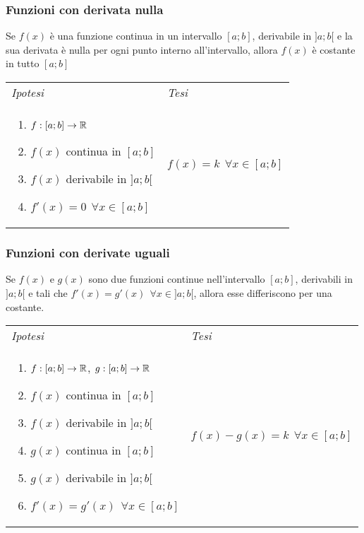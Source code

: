         \subsubsection{Funzioni con derivata nulla}
            \begin{shadedTheorem}
                Se $f(x)$ è una funzione continua in un intervallo $[a;b]$, derivabile in $]a;b[$ e la sua derivata è nulla per ogni punto interno all'intervallo, allora $f(x)$ è costante in tutto $[a;b]$
            \end{shadedTheorem}
            \begin{tabular}{m{}m{}}
                \textit{Ipotesi} & \textit{Tesi}  \\ 
                \begin{enumerate}
                \item $f:[a;b] \to \mathbb{R}$
                \item $f(x)$ continua in $[a;b]$
                \item $f(x)$ derivabile in $]a;b[$
                \item $f'(x)=0~~\forall x \in [a;b]$
        \end{enumerate} & $f(x)=k ~~ \forall x \in [a;b]$
           \end{tabular}
           
        \subsubsection{Funzioni con derivate uguali}
            \begin{shadedTheorem}
                Se $f(x)$ e $g(x)$ sono due funzioni continue nell'intervallo $[a;b]$, derivabili in $]a;b[$ e tali che $f'(x)=g'(x)~~\forall x \in ]a;b[$, allora esse differiscono per una costante.
            \end{shadedTheorem}
            \begin{tabular}{m{}m{}}
            \textit{Ipotesi} & \textit{Tesi}\\
            \begin{enumerate}
                \item $f:[a;b] \to \mathbb{R}$, $g: [a;b] \to \mathbb{R}$
                \item $f(x)$ continua in $[a;b]$
                \item $f(x)$ derivabile in $]a;b[$
                \item $g(x)$ continua in $[a;b]$
                \item $g(x)$ derivabile in $]a;b[$
                \item $f'(x)=g'(x) ~~ \forall x \in [a;b]$
        \end{enumerate} & $f(x)-g(x) = k ~~ \forall x \in [a;b]$
           \end{tabular}
